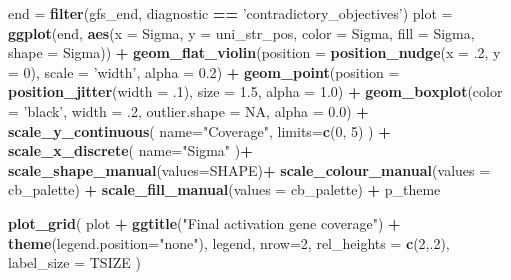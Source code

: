 \documentclass[]{book}
\newenvironment{Shaded}{\begin{snugshade}}{\end{snugshade}}
\newcommand{\DataTypeTok}[1]{\textcolor[rgb]{0.13,0.29,0.53}{#1}}
\newcommand{\DecValTok}[1]{\textcolor[rgb]{0.00,0.00,0.81}{#1}}
\newcommand{\FloatTok}[1]{\textcolor[rgb]{0.00,0.00,0.81}{#1}}
\newcommand{\KeywordTok}[1]{\textcolor[rgb]{0.13,0.29,0.53}{\textbf{#1}}}
\newcommand{\NormalTok}[1]{#1}
\newcommand{\OperatorTok}[1]{\textcolor[rgb]{0.81,0.36,0.00}{\textbf{#1}}}
\newcommand{\OtherTok}[1]{\textcolor[rgb]{0.56,0.35,0.01}{#1}}
\newcommand{\StringTok}[1]{\textcolor[rgb]{0.31,0.60,0.02}{#1}}
\begin{document}
\begin{Shaded}
\begin{Highlighting}[]
\NormalTok{end =}\StringTok{ }\KeywordTok{filter}\NormalTok{(gfs_end, diagnostic }\OperatorTok{==}\StringTok{ 'contradictory_objectives'}\NormalTok{)}
\NormalTok{plot =}\StringTok{ }\KeywordTok{ggplot}\NormalTok{(end, }\KeywordTok{aes}\NormalTok{(}\DataTypeTok{x =}\NormalTok{ Sigma, }\DataTypeTok{y =}\NormalTok{ uni_str_pos, }\DataTypeTok{color =}\NormalTok{ Sigma, }\DataTypeTok{fill =}\NormalTok{ Sigma, }\DataTypeTok{shape =}\NormalTok{ Sigma)) }\OperatorTok{+}
\StringTok{  }\KeywordTok{geom_flat_violin}\NormalTok{(}\DataTypeTok{position =} \KeywordTok{position_nudge}\NormalTok{(}\DataTypeTok{x =} \FloatTok{.2}\NormalTok{, }\DataTypeTok{y =} \DecValTok{0}\NormalTok{), }\DataTypeTok{scale =} \StringTok{'width'}\NormalTok{, }\DataTypeTok{alpha =} \FloatTok{0.2}\NormalTok{) }\OperatorTok{+}
\StringTok{  }\KeywordTok{geom_point}\NormalTok{(}\DataTypeTok{position =} \KeywordTok{position_jitter}\NormalTok{(}\DataTypeTok{width =} \FloatTok{.1}\NormalTok{), }\DataTypeTok{size =} \FloatTok{1.5}\NormalTok{, }\DataTypeTok{alpha =} \FloatTok{1.0}\NormalTok{) }\OperatorTok{+}
\StringTok{  }\KeywordTok{geom_boxplot}\NormalTok{(}\DataTypeTok{color =} \StringTok{'black'}\NormalTok{, }\DataTypeTok{width =} \FloatTok{.2}\NormalTok{, }\DataTypeTok{outlier.shape =} \OtherTok{NA}\NormalTok{, }\DataTypeTok{alpha =} \FloatTok{0.0}\NormalTok{) }\OperatorTok{+}
\StringTok{  }\KeywordTok{scale_y_continuous}\NormalTok{(}
    \DataTypeTok{name=}\StringTok{"Coverage"}\NormalTok{,}
    \DataTypeTok{limits=}\KeywordTok{c}\NormalTok{(}\DecValTok{0}\NormalTok{, }\DecValTok{5}\NormalTok{)}
\NormalTok{  ) }\OperatorTok{+}
\StringTok{  }\KeywordTok{scale_x_discrete}\NormalTok{(}
    \DataTypeTok{name=}\StringTok{"Sigma"}
\NormalTok{  )}\OperatorTok{+}
\StringTok{  }\KeywordTok{scale_shape_manual}\NormalTok{(}\DataTypeTok{values=}\NormalTok{SHAPE)}\OperatorTok{+}
\StringTok{  }\KeywordTok{scale_colour_manual}\NormalTok{(}\DataTypeTok{values =}\NormalTok{ cb_palette) }\OperatorTok{+}
\StringTok{  }\KeywordTok{scale_fill_manual}\NormalTok{(}\DataTypeTok{values =}\NormalTok{ cb_palette) }\OperatorTok{+}
\StringTok{  }\NormalTok{p_theme}

\KeywordTok{plot_grid}\NormalTok{(}
\NormalTok{  plot }\OperatorTok{+}
\StringTok{    }\KeywordTok{ggtitle}\NormalTok{(}\StringTok{"Final activation gene coverage"}\NormalTok{) }\OperatorTok{+}
\StringTok{    }\KeywordTok{theme}\NormalTok{(}\DataTypeTok{legend.position=}\StringTok{"none"}\NormalTok{),}
\NormalTok{  legend,}
  \DataTypeTok{nrow=}\DecValTok{2}\NormalTok{,}
  \DataTypeTok{rel_heights =} \KeywordTok{c}\NormalTok{(}\DecValTok{2}\NormalTok{,.}\DecValTok{2}\NormalTok{),}
  \DataTypeTok{label_size =}\NormalTok{ TSIZE}
\NormalTok{)}
\end{Highlighting}
\end{Shaded}
\end{document}

